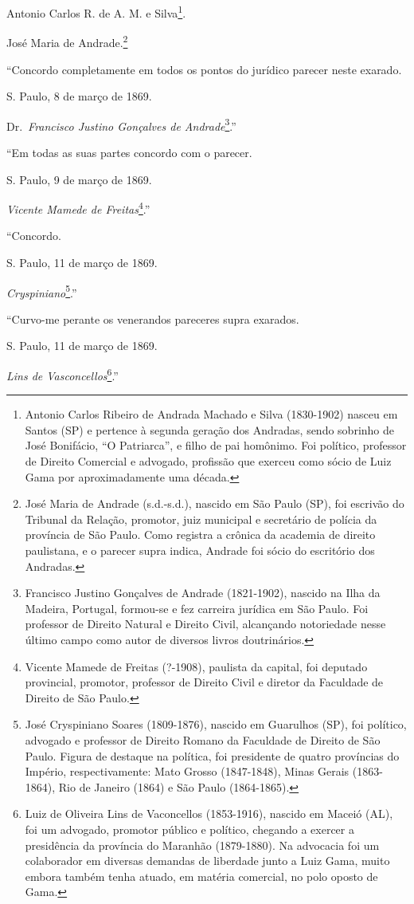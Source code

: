 Antonio Carlos R. de A. M. e Silva\footnote{Antonio Carlos Ribeiro de
  Andrada Machado e Silva (1830-1902) nasceu em Santos (SP) e pertence à
  segunda geração dos Andradas, sendo sobrinho de José Bonifácio, ``O
  Patriarca'', e filho de pai homônimo. Foi político, professor de
  Direito Comercial e advogado, profissão que exerceu como sócio de Luiz
  Gama por aproximadamente uma década.}.

José Maria de Andrade.\footnote{José Maria de Andrade (s.d.-s.d.),
  nascido em São Paulo (SP), foi escrivão do Tribunal da Relação,
  promotor, juiz municipal e secretário de polícia da província de São
  Paulo. Como registra a crônica da academia de direito paulistana, e o
  parecer supra indica, Andrade foi sócio do escritório dos Andradas.}

``Concordo completamente em todos os pontos do jurídico parecer neste
exarado.

S. Paulo, 8 de março de 1869.

Dr.~\emph{Francisco Justino Gonçalves de Andrade}\footnote{Francisco
  Justino Gonçalves de Andrade (1821-1902), nascido na Ilha da Madeira,
  Portugal, formou-se e fez carreira jurídica em São Paulo. Foi
  professor de Direito Natural e Direito Civil, alcançando notoriedade
  nesse último campo como autor de diversos livros doutrinários.}.''

``Em todas as suas partes concordo com o parecer.

S. Paulo, 9 de março de 1869.

\emph{Vicente Mamede de Freitas}\footnote{Vicente Mamede de Freitas
  (?-1908), paulista da capital, foi deputado provincial, promotor,
  professor de Direito Civil e diretor da Faculdade de Direito de São
  Paulo.}.''

``Concordo.

S. Paulo, 11 de março de 1869.

\emph{Cryspiniano}\footnote{José Cryspiniano Soares (1809-1876),
  nascido em Guarulhos (SP), foi político, advogado e professor de
  Direito Romano da Faculdade de Direito de São Paulo. Figura de
  destaque na política, foi presidente de quatro províncias do Império,
  respectivamente: Mato Grosso (1847-1848), Minas Gerais (1863-1864),
  Rio de Janeiro (1864) e São Paulo (1864-1865).}.''

``Curvo-me perante os venerandos pareceres supra exarados.

S. Paulo, 11 de março de 1869.

\emph{Lins de Vasconcellos}\footnote{Luiz de Oliveira Lins de
  Vaconcellos (1853-1916), nascido em Maceió (AL), foi um advogado,
  promotor público e político, chegando a exercer a presidência da
  província do Maranhão (1879-1880). Na advocacia foi um colaborador em
  diversas demandas de liberdade junto a Luiz Gama, muito embora também
  tenha atuado, em matéria comercial, no polo oposto de Gama.}.''

